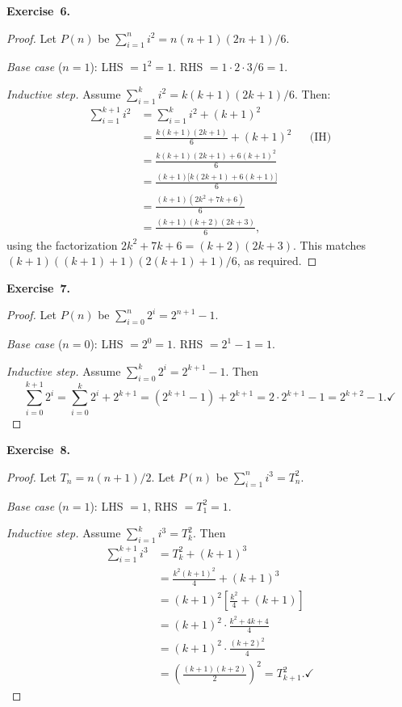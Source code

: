 \documentclass[11pt]{article}
\begin{document}
\medskip
\textbf{Exercise~6.}
\begin{proof}
Let $P(n)$ be $\sum_{i=1}^{n} i^2 = n(n+1)(2n+1)/6$.

\emph{Base case} ($n = 1$): LHS $= 1^2 = 1$. RHS $= 1 \cdot 2 \cdot 3 / 6 = 1$. \checkmark

\emph{Inductive step.} Assume $\sum_{i=1}^{k} i^2 = k(k+1)(2k+1)/6$. Then:
\begin{align*}
  \sum_{i=1}^{k+1} i^2
    &= \sum_{i=1}^{k} i^2 + (k+1)^2 \\
    &= \frac{k(k+1)(2k+1)}{6} + (k+1)^2 && \text{(IH)}\\
    &= \frac{k(k+1)(2k+1) + 6(k+1)^2}{6} \\
    &= \frac{(k+1)\bigl[k(2k+1) + 6(k+1)\bigr]}{6} \\
    &= \frac{(k+1)(2k^2 + 7k + 6)}{6} \\
    &= \frac{(k+1)(k+2)(2k+3)}{6},
\end{align*}
using the factorization $2k^2 + 7k + 6 = (k+2)(2k+3)$. This matches $(k+1)((k+1)+1)(2(k+1)+1)/6$, as required.
\end{proof}

\medskip
\textbf{Exercise~7.}
\begin{proof}
Let $P(n)$ be $\sum_{i=0}^{n} 2^i = 2^{n+1} - 1$.

\emph{Base case} ($n = 0$): LHS $= 2^0 = 1$. RHS $= 2^1 - 1 = 1$. \checkmark

\emph{Inductive step.} Assume $\sum_{i=0}^{k} 2^i = 2^{k+1} - 1$. Then
\[
  \sum_{i=0}^{k+1} 2^i = \sum_{i=0}^{k} 2^i + 2^{k+1} = (2^{k+1} - 1) + 2^{k+1} = 2 \cdot 2^{k+1} - 1 = 2^{k+2} - 1. \checkmark
\]
\end{proof}

\medskip
\textbf{Exercise~8.}
\begin{proof}
Let $T_n = n(n+1)/2$. Let $P(n)$ be $\sum_{i=1}^{n} i^3 = T_n^2$.

\emph{Base case} ($n = 1$): LHS $= 1$, RHS $= T_1^2 = 1$. \checkmark

\emph{Inductive step.} Assume $\sum_{i=1}^{k} i^3 = T_k^2$. Then
\begin{align*}
  \sum_{i=1}^{k+1} i^3
    &= T_k^2 + (k+1)^3 \\
    &= \frac{k^2(k+1)^2}{4} + (k+1)^3 \\
    &= (k+1)^2 \left[\frac{k^2}{4} + (k+1)\right] \\
    &= (k+1)^2 \cdot \frac{k^2 + 4k + 4}{4} \\
    &= (k+1)^2 \cdot \frac{(k+2)^2}{4} \\
    &= \left(\frac{(k+1)(k+2)}{2}\right)^2 = T_{k+1}^2. \checkmark
\end{align*}
\end{proof}
\end{document}
